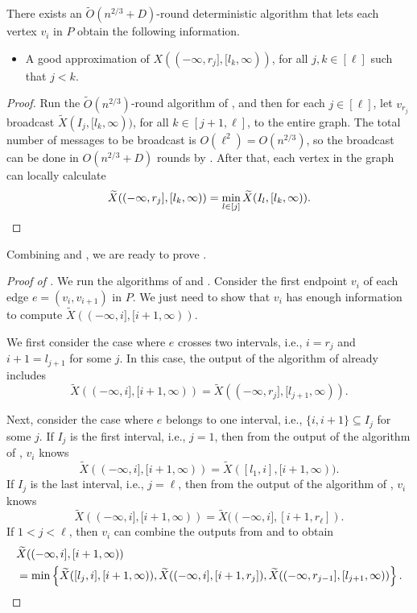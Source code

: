 \begin{lemma}
\label{lem:far2}
There exists an $\widetilde{O}(n^{2/3} + D)$-round deterministic algorithm that lets each vertex $v_i$ in $P$ obtain the following information.
\begin{itemize}
    \item A good approximation of $X((-\infty,r_j], [l_k, \infty))$, for all $j,k \in [\ell]$ such that $j < k$.
\end{itemize}
\end{lemma}
\begin{proof}
Run the $\widetilde{O}(n^{2/3})$-round algorithm of , and then for each $j \in [\ell]$, let $v_{r_j}$ broadcast $\widetilde{X}(I_j, [l_k, \infty))$, for all $k \in [j+1, \ell]$, to the entire graph. The total number of messages to be broadcast is $O(\ell^2) = O(n^{2/3})$, so the broadcast can be done in $O(n^{2/3} + D)$ rounds by . After that, each vertex in the graph can locally calculate
\[\widetilde{X}((-\infty,r_j], [l_k, \infty))=\min_{l\in[j]} \widetilde{X}(I_l, [l_k, \infty)). \qedhere\]
\end{proof}


Combining  and , we are ready to prove .

\begin{proof}[Proof of ]
 We run the algorithms of  and . Consider the first endpoint $v_i$ of each edge $e=(v_i, v_{i+1})$ in $P$. We just need to show that $v_i$ has enough information to compute $\widetilde{X}((-\infty,i], [i+1, \infty))$. 
 
 We first consider the case where $e$ crosses two intervals, i.e., $i = r_j$ and ${i+1} = l_{j+1}$ for some $j$. In this case, the output of the algorithm of  already includes \[\widetilde{X}((-\infty,i], [i+1, \infty)) = \widetilde{X}((-\infty,r_j], [l_{j+1}, \infty)).\]

 Next, consider the case where $e$ belongs to one interval, i.e., $\{i, i+1\} \subseteq I_j$ for some $j$. If $I_j$ is the first interval, i.e., $j=1$, then from the output of the algorithm of , $v_i$ knows \[\widetilde{X}((-\infty, i], [i+1, \infty)) = \widetilde{X}([l_1, i], [i+1, \infty)).\]
If $I_j$ is the last interval, i.e., $j=\ell$, then from the output of the algorithm of , $v_i$ knows \[\widetilde{X}((-\infty, i], [i+1, \infty)) = \widetilde{X}((-\infty, i], [i+1, r_\ell]).\] 
If $1 < j < \ell$, then $v_i$ can combine the outputs from   and  to obtain
\begin{align*}
&\widetilde{X}((-\infty, i], [i+1, \infty))\\ &= \min\left\{\widetilde{X}([l_j, i], [i+1, \infty)), \widetilde{X}((-\infty, i], [i+1, r_j]), \widetilde{X}((-\infty,r_{j-1}], [l_{j+1}, \infty))\right\}. \qedhere
\end{align*}
\end{proof}


